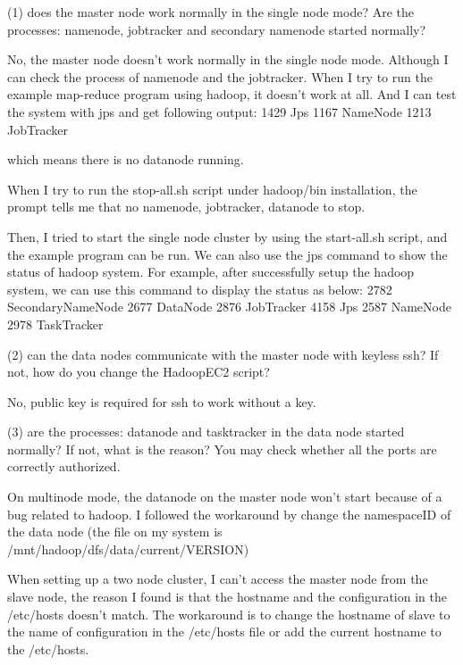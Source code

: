 (1) does the master node work normally in the single node mode? Are
the processes: namenode, jobtracker and secondary namenode started
normally? 

No, the master node doesn't work normally in the single node
mode. Although I can check the process of namenode and the
jobtracker. When I try to run the example map-reduce program using
hadoop, it doesn't work at all. 
And I can test the system with jps and get following output:
1429 Jps
1167 NameNode
1213 JobTracker

which means there is no datanode running. 

When I try to run the stop-all.sh script under hadoop/bin
installation, the prompt tells me that no namenode, jobtracker,
datanode to stop. 

Then, I tried to start the single node cluster by using the
start-all.sh script, and the example program can be run. 
We can also use the jps command to show the status of hadoop
system. For example, after successfully setup the hadoop system, we
can use this command to display the status as below: 
2782 SecondaryNameNode
2677 DataNode
2876 JobTracker
4158 Jps
2587 NameNode
2978 TaskTracker

(2) can the data nodes communicate with the master node with keyless
ssh? If not, how do you change the HadoopEC2 script? 

No, public key is required for ssh to work without a key. 

(3) are the processes: datanode and tasktracker in the data node
started normally? If not, what is the reason? You may check whether
all the ports are correctly authorized. 

On multinode mode, the datanode on the master node won't start because
of a bug related to hadoop. I followed the workaround by change the
namespaceID of the data node (the file on my system is
/mnt/hadoop/dfs/data/current/VERSION)

When setting up a two node cluster, I can't access the master node
from the slave node, the reason I found is that the hostname and the
configuration in the /etc/hosts doesn't match. The workaround is to
change the hostname of slave to the name of configuration in the
/etc/hosts file or add the current hostname to the /etc/hosts. 